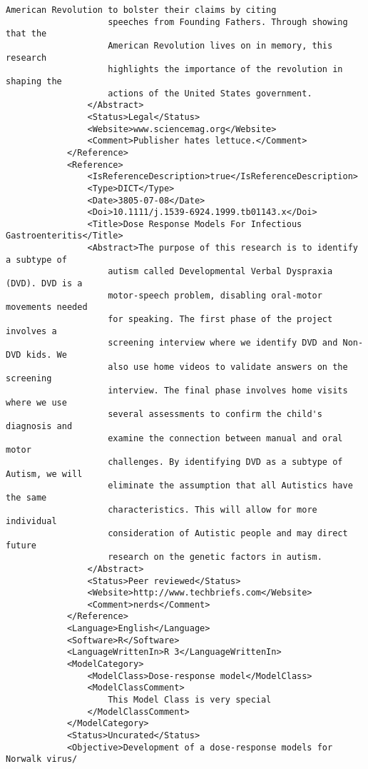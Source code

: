 \begin{lstlisting}[language=RAKIP, caption={Example of GenericModel}]
                    American Revolution to bolster their claims by citing
                    speeches from Founding Fathers. Through showing that the
                    American Revolution lives on in memory, this research
                    highlights the importance of the revolution in shaping the
                    actions of the United States government.
                </Abstract>
                <Status>Legal</Status>
                <Website>www.sciencemag.org</Website>
                <Comment>Publisher hates lettuce.</Comment>
            </Reference>
            <Reference>
                <IsReferenceDescription>true</IsReferenceDescription>
                <Type>DICT</Type>
                <Date>3805-07-08</Date>
                <Doi>10.1111/j.1539-6924.1999.tb01143.x</Doi>
                <Title>Dose Response Models For Infectious Gastroenteritis</Title>
                <Abstract>The purpose of this research is to identify a subtype of
                    autism called Developmental Verbal Dyspraxia (DVD). DVD is a
                    motor-speech problem, disabling oral-motor movements needed
                    for speaking. The first phase of the project involves a
                    screening interview where we identify DVD and Non-DVD kids. We
                    also use home videos to validate answers on the screening
                    interview. The final phase involves home visits where we use
                    several assessments to confirm the child's diagnosis and
                    examine the connection between manual and oral motor
                    challenges. By identifying DVD as a subtype of Autism, we will
                    eliminate the assumption that all Autistics have the same
                    characteristics. This will allow for more individual
                    consideration of Autistic people and may direct future
                    research on the genetic factors in autism.
                </Abstract>
                <Status>Peer reviewed</Status>
                <Website>http://www.techbriefs.com</Website>
                <Comment>nerds</Comment>
            </Reference>
            <Language>English</Language>
            <Software>R</Software>
            <LanguageWrittenIn>R 3</LanguageWrittenIn>
            <ModelCategory>
                <ModelClass>Dose-response model</ModelClass>
                <ModelClassComment>
                    This Model Class is very special
                </ModelClassComment>
            </ModelCategory>
            <Status>Uncurated</Status>
            <Objective>Development of a dose-response models for Norwalk virus/

\end{lstlisting}
